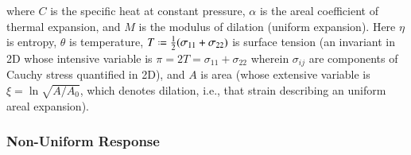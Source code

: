 where $C$ is the specific heat at constant pressure, $\alpha$ is the areal coefficient of thermal expansion, and $M$ is the modulus of dilation (uniform expansion).  Here $\eta$ is entropy, $\theta$ is temperature, $T \defeq \tfrac{1}{2} ( \sigma_{11} + \sigma_{22})$ is surface tension (an invariant in 2D whose intensive variable is $\pi = 2T = \sigma_{11} + \sigma_{22}$ wherein $\sigma_{ij}$ are components of Cauchy stress quantified in 2D), and $A$ is area (whose extensive variable is $\xi = \ln \sqrt{A / \! A_0}$, which denotes dilation, i.e., that strain describing an uniform areal expansion).  

\subsubsection{Non-Uniform Response}


